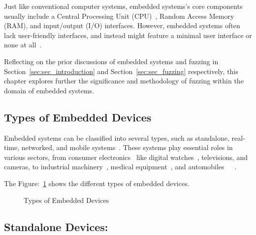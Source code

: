 Just like conventional computer systems, embedded systems's core components
usually include a Central Processing Unit (CPU)~\cite{WhatisaC78:online},
Random Access Memory (RAM), and input/output (I/O) interfaces. However,
embedded systems often lack user-friendly interfaces, and instead might
feature a minimal user interface or none at all~\cite{MainType35:online}.

Reflecting on the prior discussions of embedded systems and fuzzing in
Section~\ref{sec:sec_introduction} and Section~\ref{sec:sec_fuzzing} respectively,
this chapter explores further the significance and methodology of fuzzing
within the domain of embedded systems.

\subsection{Types of Embedded Devices}
Embedded systems can be classified into several types, such as standalone,
real-time, networked, and mobile systems~\cite{Classifi68:online}. These systems
play essential roles in various sectors, from consumer
electronics~\cite{andrae2010life} like digital watches~\cite{Whatisas39:online},
televisions, and cameras, to industrial machinery~\cite{thramboulidis2007soa},
medical equipment~\cite{jafari2007medical},
and automobiles~\cite{Automoti68:online}~\cite{li2003real}~\cite{MainType35:online}.

The Figure:~\ref{fig:types_of_embedded_devices} shows the different types of embedded devices.

\begin{figure}[h]
        \centering
        \caption{Types of Embedded Devices~\cite{yun2022fuzzing}~\cite{WhatAreE30:online}}
        \label{fig:types_of_embedded_devices}
\end{figure}

\subsection*{Standalone Devices:}

